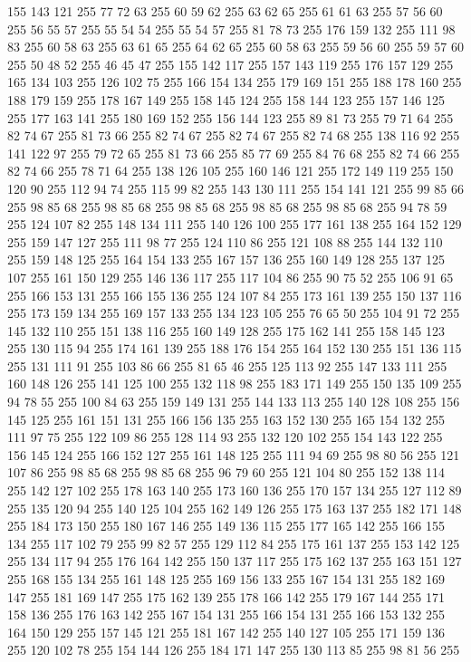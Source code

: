 155 143 121 255 77 72 63 255 60 59 62 255 63 62 65 255 61 61 63 255 57 56 60 255 56 55 57 255 55 54 54 255 55 54 57 255 81 78 73 255 176 159 132 255 111 98 83 255 60 58 63 255 63 61 65 255 64 62 65 255 60 58 63 255 59 56 60 255 59 57 60 255 50 48 52 255 46 45 47 255 155 142 117 255 157 143 119 255 176 157 129 255 165 134 103 255 126 102 75 255 166 154 134 255 179 169 151 255 188 178 160 255 188 179 159 255 178 167 149 255 158 145 124 255 158 144 123 255 157 146 125 255 177 163 141 255 180 169 152 255 156 144 123 255 89 81 73 255 79 71 64 255 82 74 67 255 81 73 66 255 82 74 67 255 82 74 67 255 82 74 68 255 138 116 92 255 141 122 97 255 79 72 65 255 81 73 66 255 85 77 69 255 84 76 68 255 82 74 66 255 82 74 66 255 78 71 64 255 138 126 105 255 160 146 121 255 172 149 119 255 150 120 90 255 112 94 74 255 115 99 82 255 143 130 111 255 154 141 121 255 99 85 66 255 98 85 68 255 98 85 68 255 98 85 68 255
98 85 68 255 98 85 68 255 94 78 59 255 124 107 82 255 148 134 111 255 140 126 100 255 177 161 138 255 164 152 129 255 159 147 127 255 111 98 77 255 124 110 86 255 121 108 88 255 144 132 110 255 159 148 125 255 164 154 133 255 167 157 136 255 160 149 128 255 137 125 107 255 161 150 129 255 146 136 117 255 117 104 86 255 90 75 52 255 106 91 65 255 166 153 131 255 166 155 136 255 124 107 84 255 173 161 139 255 150 137 116 255 173 159 134 255 169 157 133 255 134 123 105 255 76 65 50 255 104 91 72 255 145 132 110 255 151 138 116 255 160 149 128 255 175 162 141 255 158 145 123 255 130 115 94 255 174 161 139 255 188 176 154 255 164 152 130 255 151 136 115 255 131 111 91 255 103 86 66 255 81 65 46 255 125 113 92 255 147 133 111 255 160 148 126 255 141 125 100 255 132 118 98 255 183 171 149 255 150 135 109 255 94 78 55 255 100 84 63 255 159 149 131 255 144 133 113 255 140 128 108 255 156 145 125 255 161 151 131 255 166 156 135 255 163 152 130 255 165 154 132 255 111 97 75 255
122 109 86 255 128 114 93 255 132 120 102 255 154 143 122 255 156 145 124 255 166 152 127 255 161 148 125 255 111 94 69 255 98 80 56 255 121 107 86 255 98 85 68 255 98 85 68 255 96 79 60 255 121 104 80 255 152 138 114 255 142 127 102 255 178 163 140 255 173 160 136 255 170 157 134 255 127 112 89 255 135 120 94 255 140 125 104 255 162 149 126 255 175 163 137 255 182 171 148 255 184 173 150 255 180 167 146 255 149 136 115 255 177 165 142 255 166 155 134 255 117 102 79 255 99 82 57 255 129 112 84 255 175 161 137 255 153 142 125 255 134 117 94 255 176 164 142 255 150 137 117 255 175 162 137 255 163 151 127 255 168 155 134 255 161 148 125 255 169 156 133 255 167 154 131 255 182 169 147 255 181 169 147 255 175 162 139 255 178 166 142 255 179 167 144 255 171 158 136 255 176 163 142 255 167 154 131 255 166 154 131 255 166 153 132 255 164 150 129 255 157 145 121 255 181 167 142 255 140 127 105 255 171 159 136 255 120 102 78 255 154 144 126 255 184 171 147 255 130 113 85 255 98 81 56 255
